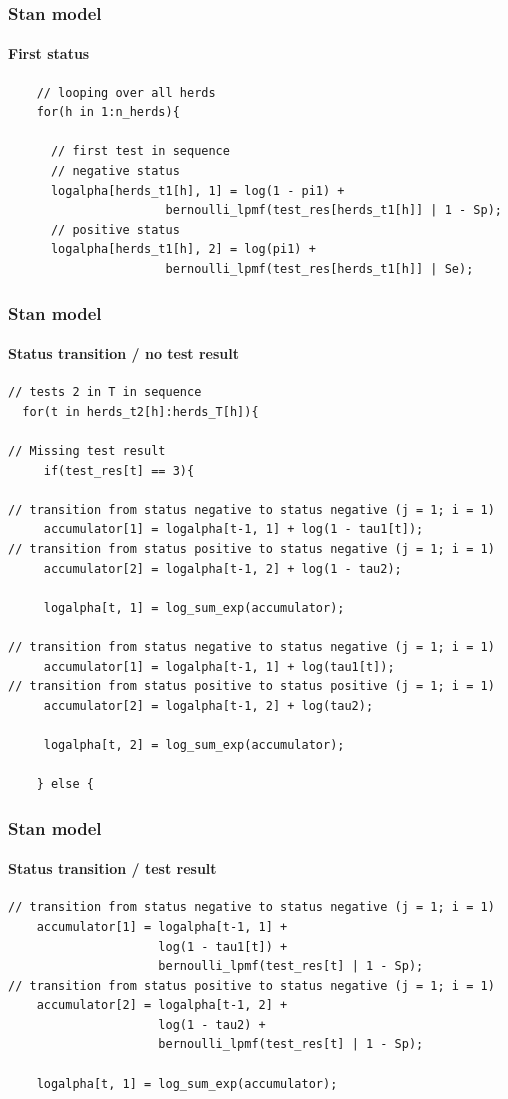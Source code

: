 \documentclass{beamer}
\begin{document}
\begin{frame}[fragile]
\frametitle{Stan model}
\framesubtitle{First status}
\scriptsize
\begin{verbatim}
    // looping over all herds
    for(h in 1:n_herds){

      // first test in sequence
      // negative status
      logalpha[herds_t1[h], 1] = log(1 - pi1) + 
                      bernoulli_lpmf(test_res[herds_t1[h]] | 1 - Sp);
      // positive status
      logalpha[herds_t1[h], 2] = log(pi1) + 
                      bernoulli_lpmf(test_res[herds_t1[h]] | Se);

 \end{verbatim}
\end{frame}


\begin{frame}[fragile]
\frametitle{Stan model}
\framesubtitle{Status transition / no test result}
\scriptsize
\begin{verbatim}
// tests 2 in T in sequence
  for(t in herds_t2[h]:herds_T[h]){

// Missing test result     
     if(test_res[t] == 3){

// transition from status negative to status negative (j = 1; i = 1)
     accumulator[1] = logalpha[t-1, 1] + log(1 - tau1[t]);
// transition from status positive to status negative (j = 1; i = 1)
     accumulator[2] = logalpha[t-1, 2] + log(1 - tau2);

     logalpha[t, 1] = log_sum_exp(accumulator);

// transition from status negative to status negative (j = 1; i = 1)
     accumulator[1] = logalpha[t-1, 1] + log(tau1[t]);
// transition from status positive to status positive (j = 1; i = 1)
     accumulator[2] = logalpha[t-1, 2] + log(tau2);

     logalpha[t, 2] = log_sum_exp(accumulator);

    } else {
 \end{verbatim}
\end{frame}


\begin{frame}[fragile]
\frametitle{Stan model}
\framesubtitle{Status transition / test result}
\scriptsize
\begin{verbatim}
// transition from status negative to status negative (j = 1; i = 1)
    accumulator[1] = logalpha[t-1, 1] + 
                     log(1 - tau1[t]) + 
                     bernoulli_lpmf(test_res[t] | 1 - Sp);
// transition from status positive to status negative (j = 1; i = 1)
    accumulator[2] = logalpha[t-1, 2] + 
                     log(1 - tau2) + 
                     bernoulli_lpmf(test_res[t] | 1 - Sp);

    logalpha[t, 1] = log_sum_exp(accumulator);
\end{verbatim}
\end{frame}
\end{document}
